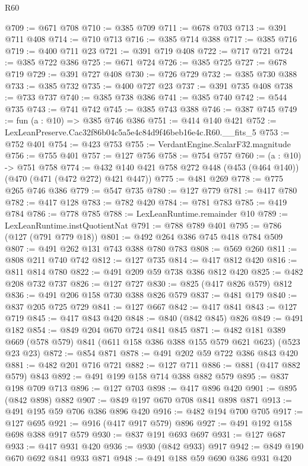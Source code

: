 \begin{lexlean}{R60}
\begin{coremodule}
@709 := @671 @708
@710 := @385 @709
@711 := @678 @703
@713 := @391 @711 @408
@714 := @710 @713
@716 := @385 @714 @388
@717 := @385 @716
@719 := @400 @711 @23
@721 := @391 @719 @408
@722 := @717 @721
@724 := @385 @722 @386
@725 := @671 @724
@726 := @385 @725
@727 := @678 @719
@729 := @391 @727 @408
@730 := @726 @729
@732 := @385 @730 @388
@733 := @385 @732
@735 := @400 @727 @23
@737 := @391 @735 @408
@738 := @733 @737
@740 := @385 @738 @386
@741 := @385 @740
@742 := @544 @735
@743 := @741 @742
@745 := @385 @743 @388
@746 := @387 @745
@749 := fun (a : @10) => @385 @746 @386
@751 := @414 @140 @421
@752 := LexLeanPreserve.Cac32f86b04c5a5e4c84d9f46beb16e4c.R60.__fits_5
@753 := @752 @401
@754 := @423 @753
@755 := VerdantEngine.ScalarF32.magnitude
@756 := @755 @401
@757 := @127 @756
@758 := @754 @757
@760 := (a : @10) -> @751 @758
@774 := @432 @140 @421 @758 @272 @448 (@453 (@464 @140)) (@470 (@471 (@472 @272) @421 @447))
@775 := @481 @269
@778 := @775 @265 @746 @386
@779 := @547 @735
@780 := @127 @779
@781 := @417 @780
@782 := @417 @128
@783 := @782 @420
@784 := @781 @783
@785 := @419 @784
@786 := @778 @785
@788 := LexLeanRuntime.remainder @10
@789 := LexLeanRuntime.instQuotientNat
@791 := @788 @789 @401
@795 := @786 (@127 (@791 @779 @18))
@801 := @492 @264 @386 @745 @418 @784 @509
@807 := @491 @262 @131 @743 @388 @780 @783
@808 := @569 @260
@811 := @808 @211 @740 @742
@812 := @127 @735
@814 := @417 @812 @420
@816 := @811 @814 @780
@822 := @491 @209 @59 @738 @386 @812 @420
@825 := @482 @208 @732 @737
@826 := @127 @727
@830 := @825 (@417 @826 @579) @812
@836 := @491 @206 @158 @730 @388 @826 @579
@837 := @481 @179
@840 := @837 @205 @725 @729
@841 := @127 @667
@842 := @417 @841
@843 := @127 @719
@845 := @417 @843 @420
@848 := @840 (@842 @845) @826
@849 := @491 @182
@854 := @849 @204 @670 @724 @841 @845
@871 := @482
    @181
    @389
    @669
    (@578 @579)
    @841
    (@611 @158 @386 @388 @155 @579 @621 @623)
    (@523 @23 @23)
@872 := @854 @871
@878 := @491 @202 @59 @722 @386 @843 @420
@881 := @482 @201 @716 @721
@882 := @127 @711
@886 := @881 (@417 @882 @579) @843
@892 := @491 @199 @158 @714 @388 @882 @579
@895 := @837 @198 @709 @713
@896 := @127 @703
@898 := @417 @896 @420
@901 := @895 (@842 @898) @882
@907 := @849 @197 @670 @708 @841 @898 @871
@913 := @491 @195 @59 @706 @386 @896 @420
@916 := @482 @194 @700 @705
@917 := @127 @695
@921 := @916 (@417 @917 @579) @896
@927 := @491 @192 @158 @698 @388 @917 @579
@930 := @837 @191 @693 @697
@931 := @127 @687
@933 := @417 @931 @420
@936 := @930 (@842 @933) @917
@942 := @849 @190 @670 @692 @841 @933 @871
@948 := @491 @188 @59 @690 @386 @931 @420

\end{coremodule}
\end{lexlean}
